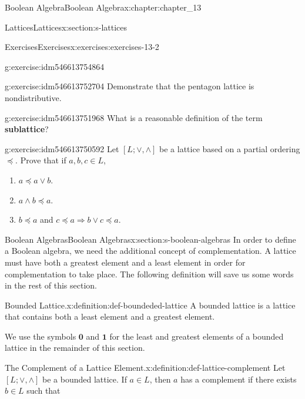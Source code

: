 \documentclass[oneside,10pt,]{book}
\newcommand{\terminology}[1]{\textbf{#1}}
\numberwithin{equation}{section}
\begin{document}
\begin{chapterptx}{Boolean Algebra}{}{Boolean Algebra}{}{}{x:chapter:chapter_13}
\begin{sectionptx}{Lattices}{}{Lattices}{}{}{x:section:s-lattices}
\begin{exercises-subsection}{Exercises}{}{Exercises}{}{}{x:exercises:exercises-13-2}
\begin{divisionexercise}{3}{}{}{g:exercise:idm546613754864}
\begin{enumerate}[label=(\alph*)]
\end{enumerate}
%
\end{divisionexercise}%
\begin{divisionexercise}{4}{}{}{g:exercise:idm546613752704}%
Demonstrate that the pentagon lattice is nondistributive.%
\end{divisionexercise}%
\begin{divisionexercise}{5}{}{}{g:exercise:idm546613751968}%
What is a reasonable definition of the term \terminology{sublattice}?%
\end{divisionexercise}%
\begin{divisionexercise}{6}{}{}{g:exercise:idm546613750592}%
Let \([L; \lor  , \land ]\) be a lattice based on a partial ordering \(\preceq\).   Prove that if \(a, b, c \in L\),%
\begin{enumerate}[label=(\alph*)]
\item{}\(a \preceq a \lor  b \).%
\item{}\(a \land  b \preceq  a\).%
\item{}\(b \preceq  a\) and \(c \preceq  a \Rightarrow   b \lor  c \preceq a\).%
\end{enumerate}
%
\end{divisionexercise}%
\end{exercises-subsection}
\end{sectionptx}
%
%
\typeout{************************************************}
\typeout{************************************************}
%
\begin{sectionptx}{Boolean Algebras}{}{Boolean Algebras}{}{}{x:section:s-boolean-algebras}
%
In order to define a Boolean algebra, we need the additional concept of complementation. A lattice must have both a greatest element and a least element in order for complementation to take place.  The following definition will save us some words in the rest of this section.%
\begin{definition}{Bounded Lattice.}{x:definition:def-boundeded-lattice}%
%
A bounded lattice is a lattice that contains both a least element and a greatest element.%
\end{definition}
We use the symbols \(\pmb{0}\) and  \(\pmb{1}\) for the least and greatest elements of a bounded lattice in the remainder of this section.%
\begin{definition}{The Complement of a Lattice Element.}{x:definition:def-lattice-complement}%
%
Let \([L; \lor ,\land ]\) be a bounded lattice.  If \(a \in L\), then \(a\) has a complement if there exists \(b \in L\) such that%

\end{definition}
\end{sectionptx}
\end{chapterptx}
\end{document}
